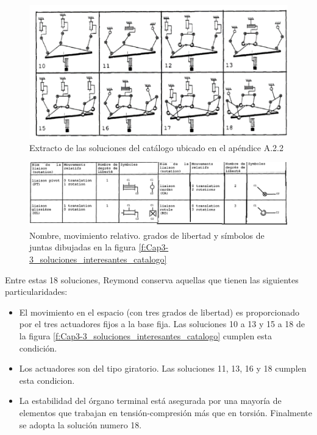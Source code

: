      \begin{figure}[htb]
        \centering
        \includegraphics[width=0.85\linewidth]{Main/Chapter3/Images3/3-3/soluciones-interesantes.png}
        \caption{Extracto de las soluciones del catálogo ubicado en el apéndice A.2.2  \cite{Clavel:31403}}
        \label{f:Cap3-3_soluciones_interesantes_catalogo}
    \end{figure}
 
      \begin{figure}[htb]
        \centering
        \includegraphics[width=0.8\linewidth]{Main/Chapter4/Images4/juntas.png}
        \caption{Nombre, movimiento relativo. grados de libertad y símbolos de juntas dibujadas en la figura  \eqref{f:Cap3-3_soluciones_interesantes_catalogo}  \cite{Clavel:31403}}
        \label{f:Cap3-3_soluciones_interesantes_catalogo_JUNTAS}
    \end{figure}
 
 Entre estas 18 soluciones, Reymond conserva aquellas que tienen las siguientes particularidades:   
    \begin{itemize}
        \item El movimiento en el espacio (con tres grados de libertad) es proporcionado por el tres actuadores fijos a la base fija. Las soluciones 10 a 13 y 15 a 18 de la figura \eqref{f:Cap3-3_soluciones_interesantes_catalogo} cumplen esta condición.
        \item Los actuadores son del tipo giratorio. Las soluciones 11, 13, 16 y 18 cumplen esta condicion.
        \item La estabilidad del órgano terminal está asegurada por una mayoría de elementos que trabajan en tensión-compresión más que en torsión. Finalmente se adopta la solución numero 18.
    \end{itemize}
    

